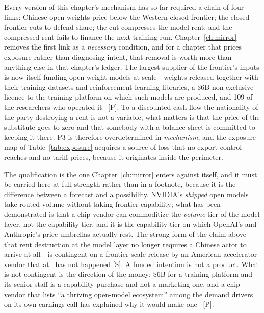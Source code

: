 Every version of this chapter's mechanism has so far required a chain of four links: Chinese open weights price below the Western closed frontier; the closed frontier cuts to defend share; the cut compresses the model rent; and the compressed rent fails to finance the next training run. Chapter~\ref{ch:mirror} removes the first link as a \emph{necessary} condition, and for a chapter that prices exposure rather than diagnosing intent, that removal is worth more than anything else in that chapter's ledger. The largest supplier of the frontier's inputs is now itself funding open-weight models at scale---weights released together with their training datasets and reinforcement-learning libraries, a \$6B non-exclusive licence to the training platform on which such models are produced, and 109 of the researchers who operated it~\cite{nemotron,nvda-poolside} [P]. To a discounted cash flow the nationality of the party destroying a rent is not a variable; what matters is that the price of the substitute goes to zero and that somebody with a balance sheet is committed to keeping it there. P3 is therefore overdetermined in \emph{mechanism}, and the exposure map of Table~\ref{tab:exposure} acquires a source of loss that no export control reaches and no tariff prices, because it originates inside the perimeter.

The qualification is the one Chapter~\ref{ch:mirror} enters against itself, and it must be carried here at full strength rather than in a footnote, because it is the difference between a forecast and a possibility. NVIDIA's \emph{shipped} open models take routed volume without taking frontier capability; what has been demonstrated is that a chip vendor can commoditize the \emph{volume} tier of the model layer, not the capability tier, and it is the capability tier on which OpenAI's and Anthropic's price umbrellas actually rest. The strong form of the claim above---that rent destruction at the model layer no longer requires a Chinese actor to arrive at all---is contingent on a frontier-scale release by an American accelerator vendor that at \datafreeze\ has not happened [S]. A funded intention is not a product. What is not contingent is the direction of the money: \$6B for a training platform and its senior staff is a capability purchase and not a marketing one, and a chip vendor that lists ``a thriving open-model ecosystem'' among the demand drivers on its own earnings call has explained why it would make one~\cite{nvda-huang-q2} [P].

